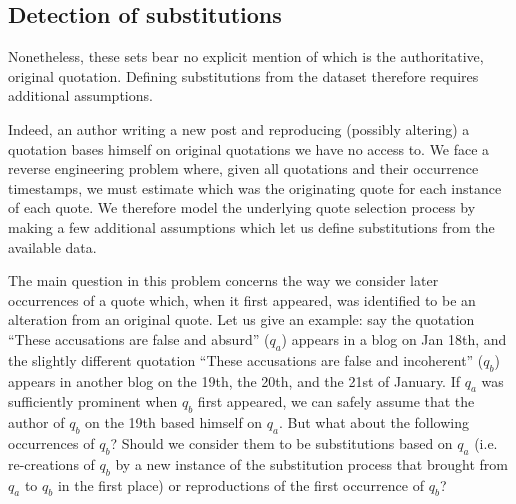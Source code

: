 \subsection{Detection of substitutions}

Nonetheless, these sets bear no explicit mention of which is the authoritative, original quotation.  Defining substitutions from the dataset therefore requires additional assumptions.  

Indeed, an author writing a new post and reproducing (possibly altering) a quotation bases himself on original quotations we have no access to. We face a reverse engineering problem where, given all quotations and their occurrence timestamps, we must estimate which was the originating quote for each instance of each quote. We therefore model the underlying quote selection process by making a few additional assumptions which let us define substitutions from the available data.

The main question in this problem concerns the way we consider later occurrences of a quote which, when it first appeared, was identified to be an alteration from an original quote. Let us give an example: say the quotation ``These accusations are false and absurd'' ($q_a$) appears in a blog on Jan 18th, and the slightly different quotation ``These accusations are false and incoherent'' ($q_b$) appears in another blog on the 19th, the 20th, and the 21st of January. If $q_a$ was sufficiently prominent when $q_b$ first appeared, we can safely assume that the author of $q_b$ on the 19th based himself on $q_a$. But what about the following occurrences of $q_b$? Should we consider them to be substitutions based on $q_a$ (i.e. re-creations of $q_b$ by a new instance of the substitution process that brought from $q_a$ to $q_b$ in the first place) or reproductions of the first occurrence of $q_b$?

